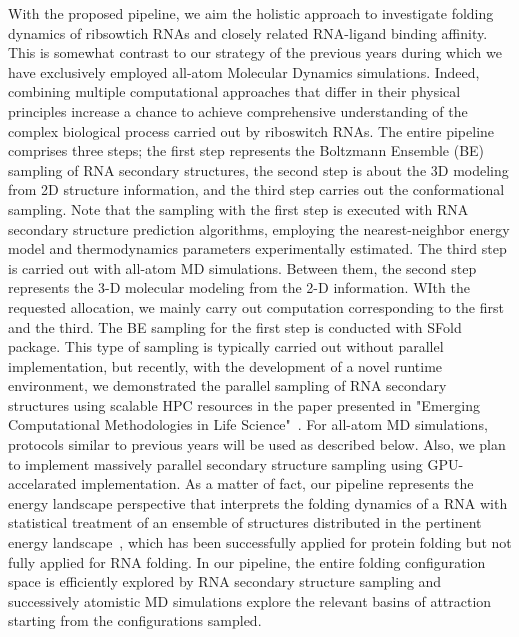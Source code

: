 \documentclass[a4paper,10pt]{article}
\begin{document}
With the proposed pipeline, we aim the holistic approach to investigate folding dynamics of ribsowtich RNAs and closely related RNA-ligand binding affinity.  This is somewhat contrast to our strategy of the previous years during which we have exclusively employed all-atom Molecular Dynamics simulations.  Indeed, combining multiple computational approaches that differ in their physical principles increase a chance to achieve comprehensive understanding of the complex biological process carried out by riboswitch RNAs.  The entire pipeline comprises three steps; the first step represents the Boltzmann Ensemble (BE) sampling of RNA secondary structures, the second step is about the 3D modeling from 2D structure information, and the third step carries out the conformational sampling.  Note that the sampling with the first step is executed with RNA secondary structure prediction algorithms, employing the nearest-neighbor energy model and thermodynamics parameters experimentally estimated.  The third step is carried out with all-atom MD simulations.  Between them, the second step represents the 3-D molecular modeling from the 2-D information.  WIth the requested allocation, we mainly carry out computation corresponding to the first and the third.  The BE sampling for the first step is conducted with SFold package\cite{ding2006}.  This type of sampling is typically carried out without parallel implementation, but recently, with the development of a novel runtime environment, we demonstrated the parallel sampling of RNA secondary structures using scalable HPC resources in the paper presented in "Emerging Computational Methodologies in Life Science"~\cite{ecmls10}. For all-atom MD simulations, protocols similar to previous years will be used as described below.  Also, we plan to implement massively parallel secondary structure sampling using GPU-accelarated implementation.   As a matter of fact, our pipeline represents the energy landscape perspective that interprets the folding dynamics of a RNA with statistical treatment of an ensemble of structures distributed in the pertinent energy landscape~\cite{onuchic1997}, which has been successfully applied for protein folding but not fully applied for RNA folding\cite{cupal1997}. In our pipeline,  the entire folding configuration space is efficiently explored by RNA secondary structure sampling and successively atomistic MD simulations explore the relevant basins of attraction starting from the configurations sampled.     
\end{document}
